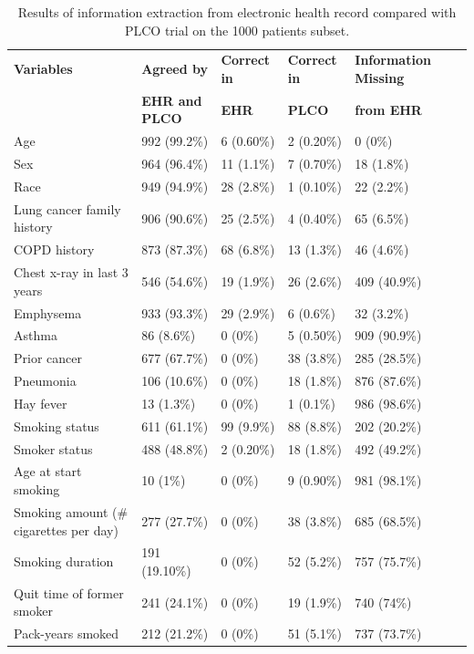 \documentclass{amia}
\begin{document}
\begin{table}[h!]
\centering
\caption{Results of information extraction from electronic health record compared with PLCO trial on the 1000 patients subset.}
\label{tab:result2}
  \begin{tabular}{|l|l|l|l|l|l|}
  \hline
    \textbf{Variables}  & \textbf{Agreed by }  & \textbf{Correct in}   & \textbf{Correct in}  & \textbf{Information Missing} \\
      & \textbf{EHR and PLCO}  & \textbf{EHR}   & \textbf{PLCO}  & \textbf{from EHR} \\ \hline    
    
 Age & 992 (99.2\%) & 6 (0.60\%) & 2 (0.20\%) & 0 (0\%) \\ \hline
 Sex & 964 (96.4\%) & 11 (1.1\%) & 7 (0.70\%) & 18 (1.8\%) \\ \hline 
 Race & 949 (94.9\%) & 28 (2.8\%) & 1 (0.10\%) & 22 (2.2\%) \\ \hline
 Lung cancer family history & 906 (90.6\%) & 25 (2.5\%) & 4 (0.40\%) & 65 (6.5\%) \\ \hline
 COPD history & 873 (87.3\%) & 68 (6.8\%) & 13 (1.3\%) & 46 (4.6\%) \\ \hline
 Chest x-ray in last 3 years & 546 (54.6\%) & 19 (1.9\%) & 26 (2.6\%) & 409 (40.9\%) \\ \hline
 Emphysema & 933 (93.3\%) & 29 (2.9\%) & 6 (0.6\%) & 32 (3.2\%) \\ \hline
 Asthma & 86 (8.6\%) & 0 (0\%) & 5 (0.50\%) & 909 (90.9\%) \\ \hline
 Prior cancer & 677 (67.7\%) & 0 (0\%) & 38 (3.8\%) & 285 (28.5\%) \\ \hline
 Pneumonia & 106 (10.6\%) & 0 (0\%) & 18 (1.8\%) & 876 (87.6\%) \\ \hline
 Hay fever & 13 (1.3\%) & 0 (0\%) & 1 (0.1\%) & 986 (98.6\%) \\ \hline
 Smoking status & 611 (61.1\%) & 99 (9.9\%) & 88 (8.8\%) & 202 (20.2\%) \\ \hline
 Smoker status & 488 (48.8\%) & 2 (0.20\%) & 18 (1.8\%) & 492 (49.2\%) \\ \hline
 Age at start smoking & 10 (1\%) & 0 (0\%) & 9 (0.90\%) & 981 (98.1\%) \\ \hline
 Smoking amount (\# cigarettes per day) & 277 (27.7\%) & 0 (0\%) & 38 (3.8\%) & 685 (68.5\%) \\ \hline
 Smoking duration & 191 (19.10\%) & 0 (0\%) & 52 (5.2\%) & 757 (75.7\%) \\ \hline
 Quit time of former smoker & 241 (24.1\%) & 0 (0\%) & 19 (1.9\%) & 740 (74\%) \\ \hline
 Pack-years smoked & 212 (21.2\%) & 0 (0\%) & 51 (5.1\%) & 737 (73.7\%) \\ \hline 
 
  \end{tabular}
\end{table}
\end{document}
